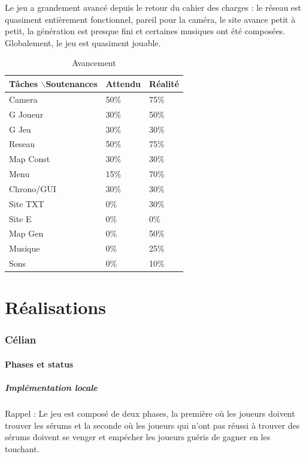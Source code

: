 \documentclass{article}
\begin{document}
Le jeu a grandement avancé depuis le retour du cahier des charges : le réseau est quasiment entièrement fonctionnel, pareil pour la caméra, le site avance petit à petit, la génération est presque fini et certaines musiques ont été composées. Globalement, le jeu est quasiment jouable.
\begin{table}[!h]
\centering
\caption{Avancement}
\begin{tabular}{|l|l|l|}

\hline
Tâches $\backslash$Soutenances & Attendu & Réalité \\ \hline
Camera & 50\% & 75\% \\ \hline
G Joueur & 30\% & 50\% \\ \hline
G Jeu & 30\% & 30\% \\ \hline
Reseau & 50\% & 75\% \\ \hline
Map Const & 30\% & 30\% \\ \hline
Menu & 15\% & 70\% \\ \hline
Chrono/GUI & 30\% & 30\% \\ \hline
Site TXT & 0\% & 30\% \\ \hline
Site E & 0\% & 0\% \\ \hline
Map Gen & 0\% & 50\% \\ \hline
Musique & 0\% & 25\% \\ \hline
Sons & 0\% & 10\% \\ \hline

\end{tabular}
\end{table}
 
\newpage
\section{Réalisations}



\subsubsection{Célian}

\paragraph{Phases et status}

\subparagraph{Implémentation locale}

Rappel : Le jeu est composé de deux phases, la première où les joueurs doivent trouver les sérums et la seconde où les joueurs qui n'ont pas réussi à trouver des sérums doivent se venger et empécher les joueurs guéris de gagner en les touchant.
\end{document}
